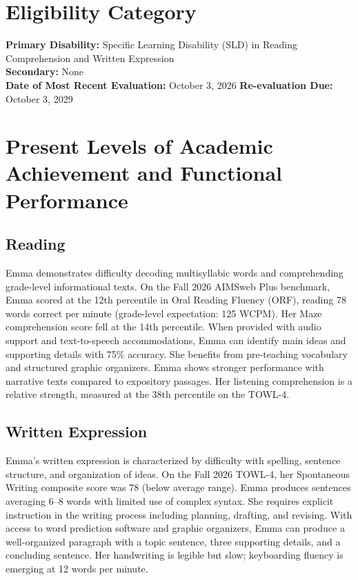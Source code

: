 \documentclass[11pt]{article}
\begin{document}
\vspace{8pt}

\section{Eligibility Category}

\begin{iepbox}
{\bfseries\color{IEPNavy} Primary Disability:} Specific Learning Disability (SLD) in Reading Comprehension and Written Expression\\[2pt]
{\bfseries\color{IEPNavy} Secondary:} None\\[2pt]
{\bfseries\color{IEPNavy} Date of Most Recent Evaluation:} October 3, 2026 \hfill
{\bfseries\color{IEPNavy} Re-evaluation Due:} October 3, 2029
\end{iepbox}

\section{Present Levels of Academic Achievement and Functional Performance}

\subsection{Reading}

Emma demonstrates difficulty decoding multisyllabic words and comprehending grade-level informational texts. On the Fall 2026 AIMSweb Plus benchmark, Emma scored at the 12th percentile in Oral Reading Fluency (ORF), reading 78 words correct per minute (grade-level expectation: 125 WCPM). Her Maze comprehension score fell at the 14th percentile. When provided with audio support and text-to-speech accommodations, Emma can identify main ideas and supporting details with 75\% accuracy. She benefits from pre-teaching vocabulary and structured graphic organizers. Emma shows stronger performance with narrative texts compared to expository passages. Her listening comprehension is a relative strength, measured at the 38th percentile on the TOWL-4.

\subsection{Written Expression}

Emma's written expression is characterized by difficulty with spelling, sentence structure, and organization of ideas. On the Fall 2026 TOWL-4, her Spontaneous Writing composite score was 78 (below average range). Emma produces sentences averaging 6--8 words with limited use of complex syntax. She requires explicit instruction in the writing process including planning, drafting, and revising. With access to word prediction software and graphic organizers, Emma can produce a well-organized paragraph with a topic sentence, three supporting details, and a concluding sentence. Her handwriting is legible but slow; keyboarding fluency is emerging at 12 words per minute.
\end{document}
